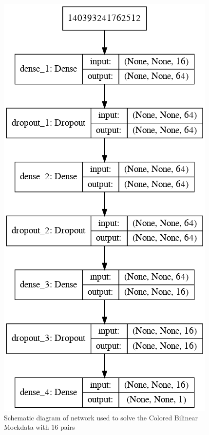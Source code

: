 \begin{refsection}
\begin{figure}[htbp]
   \centering
   \includegraphics[width=.7\columnwidth]{chapter_noise_sub/etc/net_diag}
   \caption{Schematic diagram of network used to solve the Colored Bilinear Mockdata with 16 pairs}
   \label{fig:net}
\end{figure}



\end{refsection}
